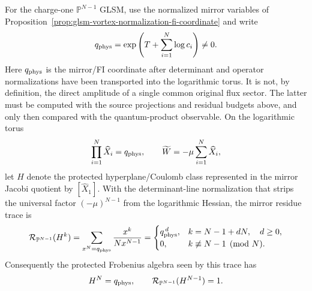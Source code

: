 \begin{proposition}
\label{prop:cpn-hv-residue-quantum-product}
For the charge-one \(\mathbb P^{N-1}\) GLSM, use the normalized mirror
variables of Proposition~\ref{prop:glsm-vortex-normalization-fi-coordinate}
and write
\begin{equation}
  q_{\rm phys}
  =
  \exp\left(T+\sum_{i=1}^N\log c_i\right)
  \neq0 .
  \label{eq:cpn-hv-physical-q}
\end{equation}
Here \(q_{\rm phys}\) is the mirror/FI coordinate after determinant and
operator normalizations have been transported into the logarithmic torus.  It
is not, by definition, the direct amplitude of a single common original flux
sector.  The latter must be computed with the source projections and residual
budgets above, and only then compared with the quantum-product observable.
On the logarithmic torus
\[
  \prod_{i=1}^N\widehat X_i=q_{\rm phys},
  \qquad
  \widetilde W=-\mu\sum_{i=1}^N\widehat X_i ,
\]
let \(H\) denote the protected hyperplane/Coulomb class represented in the
mirror Jacobi quotient by \([\widehat X_1]\).  With the determinant-line
normalization that strips the universal factor \((-\mu)^{N-1}\) from the
logarithmic Hessian, the mirror residue trace is
\begin{equation}
  \mathcal R_{\mathbb P^{N-1}}(H^k)
  =
  \sum_{x^N=q_{\rm phys}}
  \frac{x^k}{N x^{N-1}}
  =
  \begin{cases}
    q_{\rm phys}^{\,d}, & k=N-1+dN,\quad d\ge0,\\
    0, & k\not\equiv N-1\pmod{N} .
  \end{cases}
  \label{eq:cpn-hv-residue-selection-rule}
\end{equation}
Consequently the protected Frobenius algebra seen by this trace has
\[
  H^N=q_{\rm phys},
  \qquad
  \mathcal R_{\mathbb P^{N-1}}(H^{N-1})=1 .
\]
\end{proposition}

